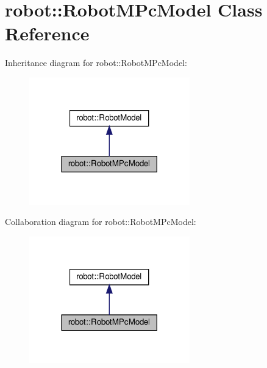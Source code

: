 \hypertarget{classrobot_1_1_robot_m_pc_model}{}\section{robot\+:\+:Robot\+M\+Pc\+Model Class Reference}
\label{classrobot_1_1_robot_m_pc_model}


Inheritance diagram for robot\+:\+:Robot\+M\+Pc\+Model\+:
\nopagebreak
\begin{figure}[H]
\begin{center}
\leavevmode
\includegraphics[width=197pt]{classrobot_1_1_robot_m_pc_model__inherit__graph}
\end{center}
\end{figure}


Collaboration diagram for robot\+:\+:Robot\+M\+Pc\+Model\+:
\nopagebreak
\begin{figure}[H]
\begin{center}
\leavevmode
\includegraphics[width=197pt]{classrobot_1_1_robot_m_pc_model__coll__graph}
\end{center}
\end{figure}
